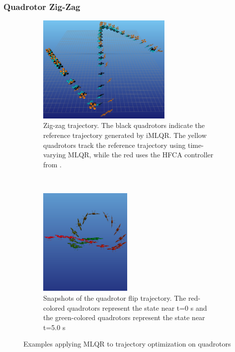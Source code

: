 \documentclass{svproc}
\begin{document}
        \subsubsection{Quadrotor Zig-Zag}
            \begin{figure}[t]
                \centering
                \begin{subfigure}[t]{0.55\textwidth}
                    \includegraphics[height=5.2cm]{figures/zig_zag_tracking.png}
                    \caption{Zig-zag trajectory. The black quadrotors indicate the reference trajectory generated by iMLQR. The yellow quadrotors track the reference trajectory using time-varying MLQR, while the red uses the HFCA controller from \cite{watterson2020control}.}
                    \label{fig:zig-zag}
                \end{subfigure}
                ~
                \begin{subfigure}[t]{0.40\textwidth}
                    \centering
                    \includegraphics[height=5.2cm,trim={0 3cm 0 0},clip]{figures/quad_flip.png}
                    \caption{Snapshots of the quadrotor flip trajectory. The red-colored quadrotors represent the state near t=0 s and the green-colored quadrotors represent the state near t=5.0 s}
                    \label{fig:quad_flip}
                \end{subfigure}
                \caption{Examples applying MLQR to trajectory optimization on quadrotors}
            \end{figure}    
            
\end{document}
